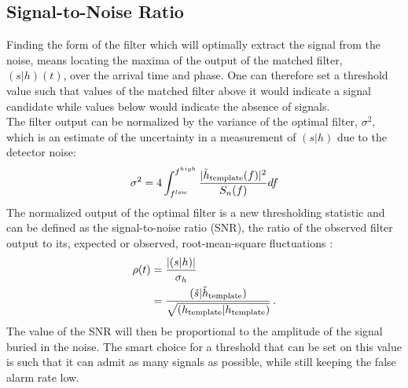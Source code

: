 \documentclass[binding=0.6cm, LaM]{sapthesis}
\begin{document}
\subsection{Signal-to-Noise Ratio}

	Finding the form of the filter which will optimally extract the signal from the noise,
        means locating the maxima of the output of the matched filter, $(s|h)(t)$, 
	over the arrival time and phase.
        One can therefore set a threshold value such that values of the matched filter 
	above it would indicate a signal candidate while values below would indicate the absence of signals. \\
	The filter output can be normalized by the variance of the optimal filter, $\sigma^2$,
	which is an estimate of the uncertainty in a measurement of $(s|h)$ due to the detector noise:
                \begin{equation}
                        \sigma^2 =4 \int^{f^{high}}_{f^{low}} {{|\tilde h_{\rm template}(f)|^2} \over {S_n(f)}}df
                \end{equation}
 	The normalized output of the optimal filter is a new thresholding statistic and can be defined as  
	the signal-to-noise ratio (SNR), the ratio of the observed filter output to its,
        expected or observed, root-mean-square fluctuations \cite{24}:
                \begin{align}
                        \rho(t) &= {{| (s|h) |} \over {\sigma_{h}}} \\
                             &= {{(\tilde s|\tilde h_{\rm template})} \over {\sqrt{(h_{\rm template}|h_{\rm template})}}}\,.
                \end{align}
        The value of the SNR will then be proportional to the amplitude of the signal buried in the noise.
	The smart choice for a threshold that can be set on this value is such that
	it can admit as many signals as possible, while still keeping the false alarm rate low. 
\end{document}
